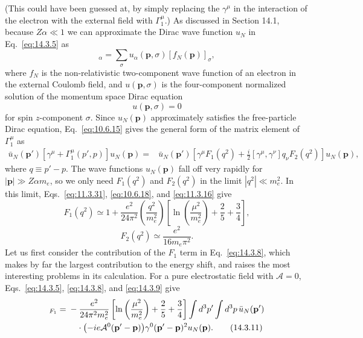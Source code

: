 (This could have been guessed at, by simply replacing the $\gamma^\mu$ in the
interaction of the electron with the external field with $\Gamma_1^\mu$.) As
discussed in Section 14.1, because $Z\alpha\ll1$ we can approximate the Dirac
wave function $u_N$ in Eq.~\eqref{eq:14.3.5} as
\begin{equation}
[u_N(\mathbf p)]_\alpha=\sum_\sigma u_\alpha(\mathbf p,\sigma)
[f_N(\mathbf p)]_\sigma,
\tag{14.3.6}\label{eq:14.3.6}
\end{equation}
where $f_N$ is the non-relativistic two-component wave function of an electron
in the external Coulomb field, and $u(\mathbf p,\sigma)$ is the four-component
normalized solution of the momentum space Dirac equation
\begin{equation}
[i\gamma_\mu p^\mu+m_e]u(\mathbf p,\sigma)=0
\tag{14.3.7}\label{eq:14.3.7}
\end{equation}
for spin $z$-component $\sigma$. Since $u_N(\mathbf p)$ approximately
satisfies the free-particle Dirac equation, Eq.~\eqref{eq:10.6.15} gives the
general form of the matrix element of $\Gamma_1^\mu$ as
\begin{align}
\bar u_N(\mathbf p')[\gamma^\mu+\Gamma_1^\mu(p',p)]u_N(\mathbf p)
={}&\bar u_N(\mathbf p')
\left[\gamma^\mu F_1(q^2)+\frac{i}{2}[\gamma^\mu,\gamma^\nu]q_\nu
F_2(q^2)\right]u_N(\mathbf p),
\tag{14.3.8}\label{eq:14.3.8}
\end{align}
where $q\equiv p'-p$. The wave functions $u_N(\mathbf p)$ fall off very rapidly
for $|\mathbf p|\gg Z\alpha m_e$, so we only need $F_1(q^2)$ and $F_2(q^2)$ in
the limit $|q^2|\ll m_e^2$. In this limit, Eqs.~\eqref{eq:11.3.31},
\eqref{eq:10.6.18}, and \eqref{eq:11.3.16} give
\begin{equation}
F_1(q^2)\simeq1+\frac{e^2}{24\pi^2}\left(\frac{q^2}{m_e^2}\right)
\left[\ln\left(\frac{\mu^2}{m_e^2}\right)+\frac25+\frac34\right],
\tag{14.3.9}\label{eq:14.3.9}
\end{equation}
\begin{equation}
F_2(q^2)\simeq\frac{e^2}{16m_e\pi^2}.
\tag{14.3.10}\label{eq:14.3.10}
\end{equation}
Let us first consider the contribution of the $F_1$ term in
Eq.~\eqref{eq:14.3.8}, which makes by far the largest contribution to the
energy shift, and raises the most interesting problems in its calculation.
For a pure electrostatic field with $\boldsymbol{\mathcal A}=0$,
Eqs.~\eqref{eq:14.3.5}, \eqref{eq:14.3.8}, and \eqref{eq:14.3.9} give
\begin{align}
[\delta E_N]_{F_1}={}&-\frac{e^2}{24\pi^2m_e^2}
\left[\ln\left(\frac{\mu^2}{m_e^2}\right)+\frac25+\frac34\right]
\int d^3p'\int d^3p\,\bar u_N(\mathbf p')
\notag\\
&\quad\cdot
\bigl(-ie\mathcal A^0(\mathbf p'-\mathbf p)\bigr)
\gamma^0(\mathbf p'-\mathbf p)^2u_N(\mathbf p).
\tag{14.3.11}\label{eq:14.3.11}
\end{align}
